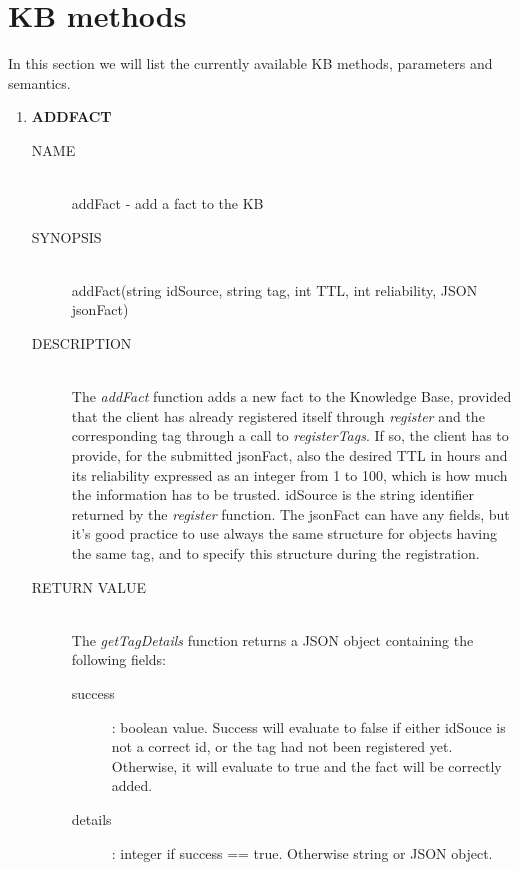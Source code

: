 \documentclass{article}
\begin{document}
\section{KB methods}
In this section we will list the currently available KB methods, parameters and semantics.
\begin{enumerate}
    \item \textbf{ADDFACT}
        \begin{description}
        \item[NAME] \hfill \\ addFact - add a fact to the KB
    	\item[SYNOPSIS] \hfill \\ addFact(string idSource, string tag, int TTL, int reliability, JSON jsonFact)
    	\item[DESCRIPTION] \hfill \\
    	The \textit{addFact} function adds a new fact to the Knowledge Base, provided that the client has already registered itself through \textit{register} and the corresponding tag through a call to \textit{registerTags}. If so, the client has to provide, for the submitted jsonFact, also the desired TTL in hours and its reliability expressed as an integer from 1 to 100, which is how much the information has to be trusted. idSource is the string identifier returned by the \textit{register} function. The jsonFact can have any fields, but it's good practice to use always the same structure for objects having the same tag, and to specify this structure during the registration.
        \item[RETURN VALUE] \hfill \\
        The \textit{getTagDetails} function returns a JSON object containing the following fields:
		\begin{description}
		    \item[success]: boolean value.
		    Success will evaluate to false if either idSouce is not a correct id, or the tag had not been registered yet. Otherwise, it will evaluate to true and the fact will be correctly added.
		    \item[details]: integer if success == true. Otherwise string or JSON object.
		

\end{description}
\end{description}
\end{enumerate}
\end{document}
